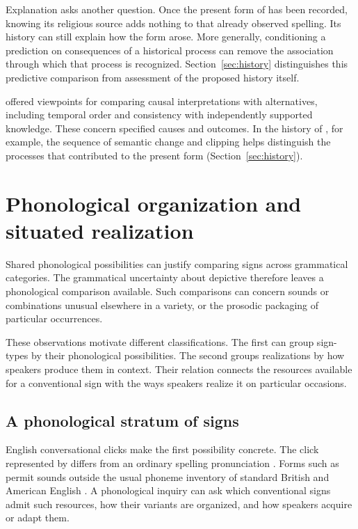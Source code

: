 \documentclass[12pt]{article}
\begin{document}
Explanation asks another question. Once the present form of 
has been recorded, knowing its religious source adds nothing to that
already observed spelling. Its history can still explain how the form
arose. More generally, conditioning a prediction on consequences of a
historical process can remove the association through which that process
is recognized. Section~\ref{sec:history} distinguishes this predictive
comparison from assessment of the proposed history itself.

\textcite[295--299]{hill1965} offered viewpoints for comparing causal
interpretations with alternatives, including temporal order and consistency
with independently supported knowledge. These concern specified causes
and outcomes. In the history of , for example, the
sequence of semantic change and clipping helps distinguish the processes
that contributed to the present form (Section~\ref{sec:history}).

\section{Phonological organization and situated realization}\label{sec:phonology}

Shared phonological possibilities can justify comparing signs across
grammatical categories. The grammatical uncertainty about depictive 
therefore leaves a phonological comparison available. Such comparisons
can concern sounds or combinations unusual elsewhere in a variety,
or the prosodic packaging of particular occurrences.

These observations motivate different classifications. The first can group
sign-types by their phonological possibilities. The second groups realizations
by how speakers produce them in context. Their relation connects
the resources available for a conventional sign with the ways speakers
realize it on particular occasions.

\subsection{A phonological stratum of signs}

English conversational clicks make the first possibility concrete. The
click represented by  differs from an ordinary spelling
pronunciation \citep[147]{wilkins1992}. Forms such as  permit
sounds outside the usual phoneme inventory of standard British and
American English \citep[853]{quirk1985}. A phonological inquiry can
ask which conventional signs admit such resources, how their variants are
organized, and how speakers acquire or adapt them.
\end{document}
